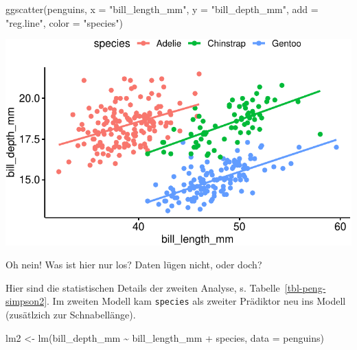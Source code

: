 \documentclass[
  a4paper,
]{scrbook}
\newenvironment{Shaded}{\begin{snugshade}}{\end{snugshade}}
\newcommand{\AttributeTok}[1]{\textcolor[rgb]{0.40,0.45,0.13}{#1}}
\newcommand{\FunctionTok}[1]{\textcolor[rgb]{0.28,0.35,0.67}{#1}}
\newcommand{\NormalTok}[1]{\textcolor[rgb]{0.00,0.23,0.31}{#1}}
\newcommand{\OtherTok}[1]{\textcolor[rgb]{0.00,0.23,0.31}{#1}}
\newcommand{\SpecialCharTok}[1]{\textcolor[rgb]{0.37,0.37,0.37}{#1}}
\newcommand{\StringTok}[1]{\textcolor[rgb]{0.13,0.47,0.30}{#1}}
\theoremstyle{definition}
\theoremstyle{definition}
\theoremstyle{definition}
\theoremstyle{remark}
\begin{document}
\begin{Shaded}
\begin{Highlighting}[]
\FunctionTok{ggscatter}\NormalTok{(penguins, }\AttributeTok{x =} \StringTok{"bill\_length\_mm"}\NormalTok{, }\AttributeTok{y =} \StringTok{"bill\_depth\_mm"}\NormalTok{, }
          \AttributeTok{add =} \StringTok{"reg.line"}\NormalTok{, }\AttributeTok{color =} \StringTok{"species"}\NormalTok{)}
\end{Highlighting}
\end{Shaded}

\includegraphics{090-regression2_files/figure-pdf/unnamed-chunk-64-1.pdf}

Oh nein! Was ist hier nur los? Daten lügen nicht, oder doch?

Hier sind die statistischen Details der zweiten Analyse, s.
Tabelle~\ref{tbl-peng-simpson2}. Im zweiten Modell kam \texttt{species}
als zweiter Prädiktor neu ins Modell (zusätlzich zur Schnabellänge).

\begin{Shaded}
\begin{Highlighting}[]
\NormalTok{lm2 }\OtherTok{\textless{}{-}} \FunctionTok{lm}\NormalTok{(bill\_depth\_mm }\SpecialCharTok{\textasciitilde{}}\NormalTok{ bill\_length\_mm }\SpecialCharTok{+}\NormalTok{ species, }\AttributeTok{data =}\NormalTok{ penguins)}
\end{Highlighting}
\end{Shaded}
\end{document}
